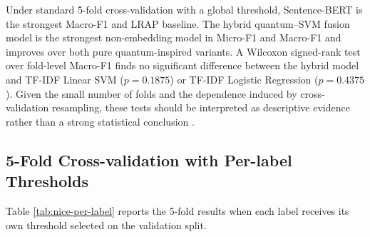 \documentclass[runningheads]{llncs}
\begin{document}
\begin{table}[htbp]
\centering
\small
\caption{Mean and standard deviation of 5-fold NICE results using one
validation-selected global threshold per fold. ``Pos.'', ``Cont.'', and
``Q--SVM'' abbreviate positive projection, contrastive projection, and hybrid
quantum--SVM.}
\label{tab:nice-cv}
\setlength{\tabcolsep}{4pt}
\end{table}

Under standard 5-fold cross-validation with a global threshold, Sentence-BERT
is the strongest Macro-F1 and LRAP baseline. The hybrid quantum--SVM fusion model is the
strongest non-embedding model in Micro-F1 and Macro-F1 and improves over both
pure quantum-inspired variants. A Wilcoxon signed-rank test over fold-level
Macro-F1 finds no significant difference between the hybrid model and TF-IDF
Linear SVM ($p=0.1875$) or TF-IDF Logistic Regression ($p=0.4375$). Given the
small number of folds and the dependence induced by cross-validation
resampling, these tests should be interpreted as descriptive evidence rather
than a strong statistical conclusion \cite{demsar2006statistical}.
\subsection{5-Fold Cross-validation with Per-label Thresholds}
Table \ref{tab:nice-per-label} reports the 5-fold results when each label
receives its own threshold selected on the validation split.
\end{document}
